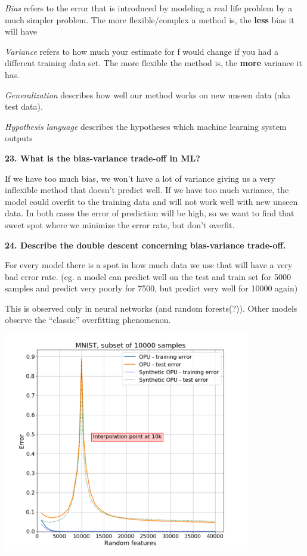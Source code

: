 \textit{Bias} refers to the error that is introduced by modeling a
real life problem by a much simpler problem. The more flexible/complex a
method is, the \textbf{less} bias it will have

\textit{Variance} refers to how much your estimate for f would change
if you had a different training data set. The more flexible the method
is, the \textbf{more} variance it has.

\textit{Generalization} describes how well our method works on new
unseen data (aka test data).

\textit{Hypothesis language} describes the hypotheses which machine
learning system outputs

\textbf{23. What is the bias-variance trade-off in ML?}

If we have too much bias, we won't have a lot of variance giving us a
very inflexible method that doesn't predict well. If we have too much
variance, the model could overfit to the training data and will not work
well with new unseen data. In both cases the error of prediction will be
high, so we want to find that sweet spot where we minimize the error
rate, but don't overfit.

\textbf{24. Describe the double descent concerning bias-variance
trade-off.}

For every model there is a spot in how much data we use that will have a
very bad error rate. (eg. a model can predict well on the test and train
set for 5000 samples and predict very poorly for 7500, but predict very
well for 10000 again)

This is observed only in neural networks (and random forests(?)). Other
models observe the ``classic'' overfitting phenomenon.

\includegraphics[width=4.26436in,height=3.78646in]{media/image1.png}

